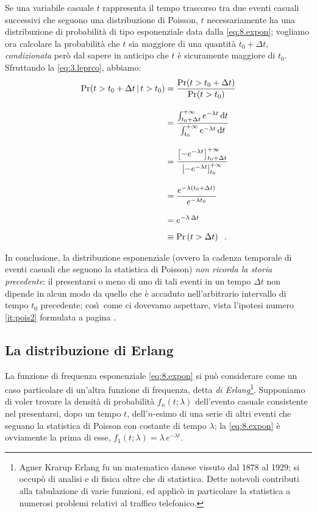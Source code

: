 Se una variabile casuale $t$ rappresenta il tempo trascorso
tra due eventi casuali successivi che seguono una
distribuzione di Poisson, $t$ necessariamente ha una
distribuzione di probabilit\`a di tipo esponenziale data
dalla \eqref{eq:8.expon}; vogliamo ora calcolare la
probabilit\`a che $t$ sia maggiore di una quantit\`a $t_0 +
\Delta t$, \emph{condizionata} per\`o dal sapere in anticipo
che $t$ \`e sicuramente maggiore di $t_0$.  Sfruttando la
\eqref{eq:3.leprco}, abbiamo:
\begin{align*}
  \Pr( t > t_0 + \Delta t \, | \, t > t_0 ) &= \frac{ \Pr(
    t > t_0 + \Delta t ) }{ \Pr( t > t_0 ) } \\[2ex]
  &= \frac{ \int_{t_0 + \Delta t}^{+ \infty} e^{- \lambda t}
    \, \mathrm{d} t }{ \int_{t_0}^{+ \infty} e^{- \lambda t} \, \mathrm{d}
    t } \\[2ex]
  &= \frac{ \left[ -e^{-\lambda t} \right]_{t_0 + \Delta
      t}^{+ \infty} }{ \left[ -e^{-\lambda t}
    \right]_{t_0}^{+ \infty} } \\[2ex]
  &= \frac{ e^{-\lambda ( t_0 + \Delta t )} }{ e^{-\lambda
      t_0} } \\[2ex]
  &= e^{-\lambda \, \Delta t} \\[1ex]
  &\equiv \Pr \left( t > \Delta t \right) \;\; .
\end{align*}

In conclusione, la distribuzione esponenziale (ovvero la
cadenza temporale di eventi casuali che seguono la
statistica di Poisson) \emph{non ricorda la storia
  precedente}: il presentarsi o meno di uno di tali eventi
in un tempo $\Delta t$ non dipende in alcun modo da quello
che \`e accaduto nell'arbitrario intervallo di tempo $t_0$
precedente; cos\`\i\ come ci dovevamo aspettare, vista
l'ipotesi numero \ref{it:pois2} formulata a pagina
\pageref{it:pois2}.%

\subsection{La distribuzione di Erlang}%
%
La funzione di frequenza esponenziale \eqref{eq:8.expon} si
pu\`o considerare come un caso particolare di un'altra
funzione di frequenza, detta \emph{di
  Erlang}\thinspace\footnote{Agner Krarup Erlang fu un
  matematico danese vissuto dal 1878 al 1929; si occup\`o di
  analisi e di fisica oltre che di statistica.  Dette
  notevoli contributi alla tabulazione di varie funzioni, ed
  applic\`o in particolare la statistica a numerosi problemi
  relativi al traffico
  telefonico.}.%
Supponiamo di voler trovare la densit\`a di probabilit\`a
$f_n(t; \lambda)$ dell'evento casuale consistente nel
presentarsi, dopo un tempo $t$, dell'$n$-esimo di una serie
di altri eventi che seguano la statistica di Poisson con
costante di tempo $\lambda$; la \eqref{eq:8.expon} \`e
ovviamente la prima di esse, $f_1(t; \lambda) = \lambda \,
e^{-\lambda t}$.

